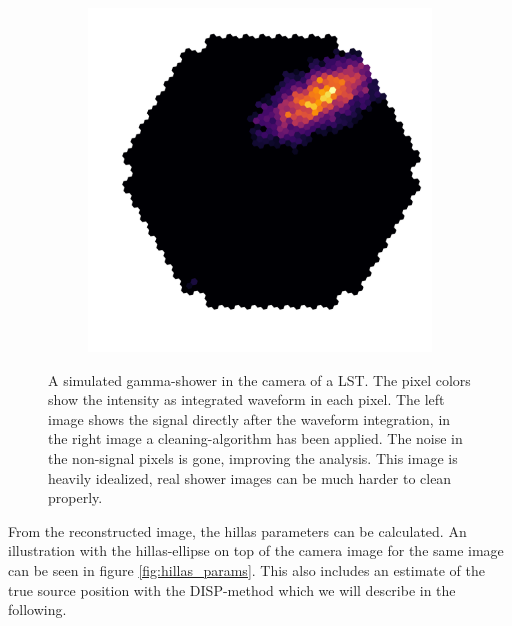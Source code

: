 \begin{figure}
\begin{subfigure}{.45\textwidth}
		\includegraphics[width=\linewidth]{Plots/hillas_cleaned.pdf}
	\end{subfigure}
	\caption{A simulated gamma-shower in the camera of a LST.
		The pixel colors show the intensity as integrated 
		waveform in each pixel. The left image 
		shows the signal directly after
		the waveform integration, in the right image
		a cleaning-algorithm has been 
		applied. The noise in the non-signal pixels is gone,
		improving the analysis.
		This image is heavily idealized, real shower images 
		can be much harder to clean properly.}
	\label{fig:shower_cleaning}
\end{figure}

From the reconstructed image, the hillas parameters can be calculated.
An illustration with the hillas-ellipse on top of the camera image 
for the same image can be seen in figure \ref{fig:hillas_params}.
This also includes an estimate of the true source position with the DISP-method
which we will describe in the following.

